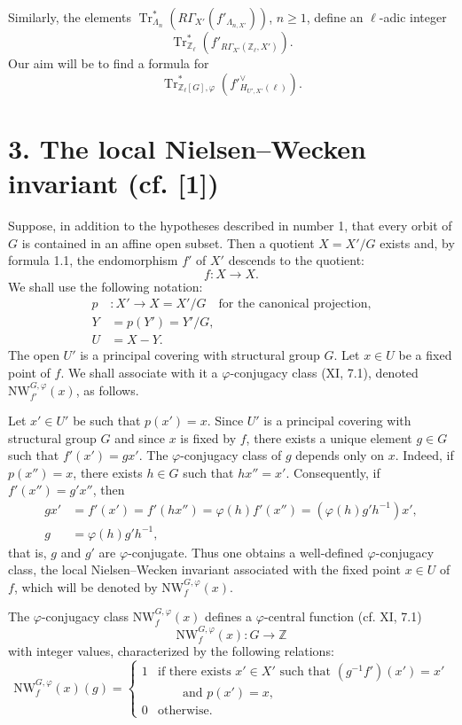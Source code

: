 \documentclass[11pt]{article}
\providecommand{\Tr}{\operatorname{Tr}}
\providecommand{\Tr}{\operatorname{Tr}}
\providecommand{\Tr}{\operatorname{Tr}}
\providecommand{\Tr}{\operatorname{Tr}}
\providecommand{\La}{\Lambda}
\providecommand{\bZ}{\mathbb Z}
\providecommand{\Tr}{\operatorname{Tr}}
\begin{document}
Similarly, the elements $\Tr^*_{\La_n}(R\Gamma_{X'}(f'_{\La_{n,X'}}))$, $n\ge1$, define an $\ell$-adic integer
\[
\Tr^*_{\bZ_\ell}(f'_{R\Gamma_{X'}(\bZ_\ell,X')}).
\]
Our aim will be to find a formula for
\[
\Tr^*_{\bZ_\ell[G],\varphi}(f'^\vee_{H_{U',X'}(\ell)}).
\]

\section*{3. The local Nielsen--Wecken invariant (cf. [1])}
Suppose, in addition to the hypotheses described in number 1, that every orbit of $G$ is contained in an affine open subset. Then a quotient $X=X'/G$ exists and, by formula 1.1, the endomorphism $f'$ of $X'$ descends to the quotient:
\[
f:X\longrightarrow X .
\]
We shall use the following notation:
\begin{align*}
p &: X'\longrightarrow X=X'/G\quad \text{for the canonical projection,}\\
Y&=p(Y')=Y'/G,\\
U&=X-Y.
\end{align*}
The open $U'$ is a principal covering with structural group $G$. Let $x\in U$ be a fixed point of $f$. We shall associate with it a $\varphi$-conjugacy class (XI, 7.1), denoted $\mathrm{NW}_{f'}^{G,\varphi}(x)$, as follows.

Let $x'\in U'$ be such that $p(x')=x$. Since $U'$ is a principal covering with structural group $G$ and since $x$ is fixed by $f$, there exists a unique element $g\in G$ such that $f'(x')=gx'$. The $\varphi$-conjugacy class of $g$ depends only on $x$. Indeed, if $p(x'')=x$, there exists $h\in G$ such that $hx''=x'$. Consequently, if $f'(x'')=g'x''$, then
\begin{align*}
gx'&=f'(x')=f'(hx'')=\varphi(h)f'(x'')=(\varphi(h)g'h^{-1})x',\\
g&=\varphi(h)g'h^{-1},
\end{align*}
that is, $g$ and $g'$ are $\varphi$-conjugate. Thus one obtains a well-defined $\varphi$-conjugacy class, the local Nielsen--Wecken invariant associated with the fixed point $x\in U$ of $f$, which will be denoted by $\mathrm{NW}_{f}^{G,\varphi}(x)$.

The $\varphi$-conjugacy class $\mathrm{NW}_{f}^{G,\varphi}(x)$ defines a $\varphi$-central function (cf. XI, 7.1)
\[
\mathrm{NW}_{f}^{G,\varphi}(x):G\longrightarrow \bZ
\]
with integer values, characterized by the following relations:
\begin{equation}\tag{3.1}
\mathrm{NW}_{f}^{G,\varphi}(x)(g)=
\begin{cases}
1&\text{if there exists }x'\in X'\text{ such that }(g^{-1}f')(x')=x'\\
 &\qquad\text{and }p(x')=x,\\
0&\text{otherwise.}
\end{cases}
\end{equation}
\end{document}
